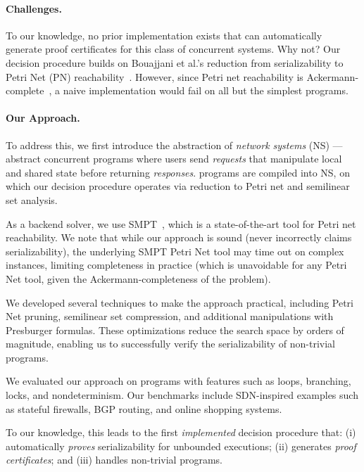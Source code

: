 \paragraph{Challenges.}
To our knowledge, no prior implementation exists that can automatically generate proof certificates for this class of concurrent systems.
Why not?
Our decision procedure builds on Bouajjani et al.'s reduction from serializability to Petri Net (PN) reachability~\cite{BoEmEnHa13}. However, since Petri net reachability is Ackermann-complete~\cite{CzWo22}, a naive implementation would fail on all but the simplest programs. 
\vspace{-.5em}
\paragraph{Our Approach.}
To address this, we first introduce the abstraction of \textit{network systems} (NS) --- abstract concurrent programs where users send \textit{requests} that manipulate local and shared state before returning \textit{responses}. \toolname{} programs are compiled into NS, on which our decision procedure operates via reduction to Petri net and semilinear set analysis.

As a backend solver, we use SMPT~\cite{AmDa23}, which is a state-of-the-art tool for Petri net reachability.
We note that while our approach is sound (never incorrectly claims serializability), the underlying SMPT Petri Net tool may time out on complex instances, limiting completeness in practice (which is unavoidable for any Petri Net tool, given the Ackermann-completeness of the problem).

We developed several techniques to make the approach practical, including Petri Net pruning, semilinear set compression, and additional manipulations with Presburger formulas.
These optimizations reduce the search space by orders of magnitude, enabling us to successfully verify the serializability of non-trivial programs.

We evaluated our approach on programs with features such as loops, branching, locks, and nondeterminism. Our benchmarks include SDN-inspired examples such as stateful firewalls, BGP routing, and online shopping systems.

To our knowledge, this leads to the first \emph{implemented} decision procedure that: (i) automatically \textit{proves} serializability for unbounded executions; (ii) generates \textit{proof certificates}; and (iii) handles non-trivial programs.


